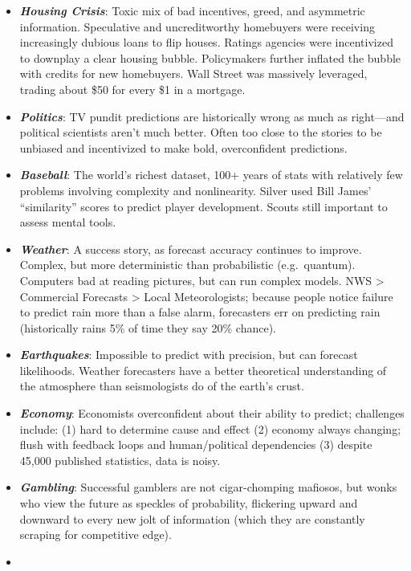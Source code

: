 \documentclass[
]{article}
\begin{document}
\begin{itemize}
\item
  \textbf{\emph{Housing Crisis}}: Toxic mix of bad incentives, greed,
  and asymmetric information. Speculative and uncreditworthy homebuyers
  were receiving increasingly dubious loans to flip houses. Ratings
  agencies were incentivized to downplay a clear housing bubble.
  Policymakers further inflated the bubble with credits for new
  homebuyers. Wall Street was massively leveraged, trading about \$50
  for every \$1 in a mortgage.
\item
  \textbf{\emph{Politics}}: TV pundit predictions are historically wrong
  as much as right---and political scientists aren't much better. Often
  too close to the stories to be unbiased and incentivized to make bold,
  overconfident predictions.
\item
  \textbf{\emph{Baseball}}: The world's richest dataset, 100+ years of
  stats with relatively few problems involving complexity and
  nonlinearity. Silver used Bill James' ``similarity'' scores to predict
  player development. Scouts still important to assess mental tools.
\item
  \textbf{\emph{Weather}}: A success story, as forecast accuracy
  continues to improve. Complex, but more deterministic than
  probabilistic (e.g.~quantum). Computers bad at reading pictures, but
  can run complex models. NWS \textgreater{} Commercial Forecasts
  \textgreater{} Local Meteorologists; because people notice failure to
  predict rain more than a false alarm, forecasters err on predicting
  rain (historically rains 5\% of time they say 20\% chance).
\item
  \textbf{\emph{Earthquakes}}: Impossible to predict with precision, but
  can forecast likelihoods. Weather forecasters have a better
  theoretical understanding of the atmosphere than seismologists do of
  the earth's crust.
\item
  \textbf{\emph{Economy}}: Economists overconfident about their ability
  to predict; challenges include: (1) hard to determine cause and effect
  (2) economy always changing; flush with feedback loops and
  human/political dependencies (3) despite 45,000 published statistics,
  data is noisy.
\item
  \textbf{\emph{Gambling}}: Successful gamblers are not cigar-chomping
  mafiosos, but wonks who view the future as speckles of probability,
  flickering upward and downward to every new jolt of information (which
  they are constantly scraping for competitive edge).
\item

\end{itemize}
\end{document}
